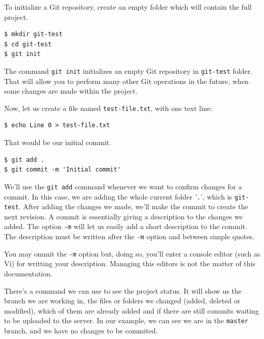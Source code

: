 \documentclass[a4paper,10pt]{article}
\newenvironment{terminal}
  {
    \vspace{+10pt}
    \begin{center}
    \begin{minipage}{0.95\textwidth}
    \begin{framed}
  }
  {
    \end{framed}
    \end{minipage}
    \end{center}
    \vspace{+10pt}
  }
\begin{document}
To initialize a Git repository, create an empty folder which will
contain the full project.

\begin{terminal}
\begin{verbatim}
$ mkdir git-test
$ cd git-test
$ git init
\end{verbatim}
\end{terminal}

The command \texttt{git init} initializes an empty Git repository in
\texttt{git-test} folder. That will allow you to perform many other Git
operations in the future, when some changes are made within the project.

Now, let us create a file named \texttt{test-file.txt}, with one text
line:

\begin{terminal}
\begin{verbatim}
$ echo Line 0 > test-file.txt
\end{verbatim}
\end{terminal}

That would be our initial commit.

\begin{terminal}
\begin{verbatim}
$ git add .
$ git commit -m 'Initial commit'
\end{verbatim}
\end{terminal}

We'll use the \texttt{git add} command whenever we want to confirm
changes for a commit. In this case, we are adding the whole current
folder '\texttt{.}', which is \texttt{git-test}. After adding the
changes we made, we'll make the commit to create the next revision.
A commit is essentially giving a description to the changes we added.
The option \texttt{-m} will let us easily add a short description to
the commit. The description must be written after the \texttt{-m} option
and between simple quotes.

\begin{tip}
You may ommit the \texttt{-m} option but, doing so, you'll enter a
console editor (such as Vi) for writting your description. Managing this
editors is not the matter of this documentation.
\end{tip}

There's a command we can use to see the project status. It will show
us the branch we are working in, the files or folders we changed
(added, deleted or modified), which of them are already added and if
there are still commits waiting to be uploaded to the server. In our
example, we can see we are in the \texttt{master} branch, and we have
no changes to be commited.
\end{document}
